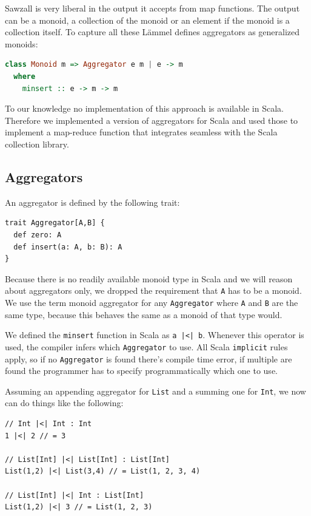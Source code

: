 \documentclass[10pt,a4paper]{article}
\begin{document}
Sawzall is very liberal in the output it accepts from map functions. The output can be a monoid, a collection of the monoid or an element if the monoid is a collection itself. To capture all these L\"ammel defines aggregators as generalized monoids:
\begin{lstlisting}[language=haskell]
class Monoid m => Aggregator e m | e -> m
  where
    minsert :: e -> m -> m
\end{lstlisting}

To our knowledge no implementation of this approach is available in Scala. Therefore we implemented a version of aggregators for Scala and used those to implement a map-reduce function that integrates seamless with the Scala collection library.

\subsection{Aggregators}

An aggregator is defined by the following trait:
\begin{lstlisting}
trait Aggregator[A,B] {
  def zero: A
  def insert(a: A, b: B): A
}
\end{lstlisting}
Because there is no readily available monoid type in Scala and we will reason about aggregators only, we dropped the requirement that \lstinline|A| has to be a monoid. We use the term monoid aggregator for any \lstinline|Aggregator| where \lstinline|A| and \lstinline|B| are the same type, because this behaves the same as a monoid of that type would.

We defined the \lstinline[language=haskell]|minsert| function in Scala as \lstinline!a |<| b!. Whenever this operator is used, the compiler infers which \lstinline|Aggregator| to use. All Scala \lstinline|implicit| rules apply, so if no \lstinline|Aggregator| is found there's compile time error, if multiple are found the programmer has to specify programmatically which one to use.

Assuming an appending aggregator for \lstinline|List| and a summing one for \lstinline|Int|, we now can do things like the following:
\begin{lstlisting}
// Int |<| Int : Int
1 |<| 2 // = 3

// List[Int] |<| List[Int] : List[Int]
List(1,2) |<| List(3,4) // = List(1, 2, 3, 4)

// List[Int] |<| Int : List[Int]
List(1,2) |<| 3 // = List(1, 2, 3)
\end{lstlisting}
\end{document}
